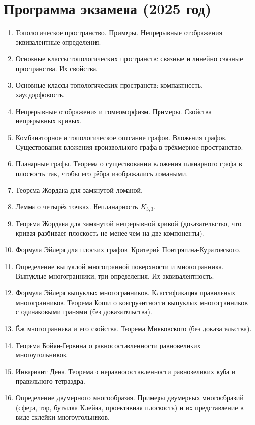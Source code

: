 \section{Программа экзамена (2025 год)}
\begin{enumerate}
    \item Топологическое пространство. Примеры. Непрерывные отображения: эквивалентные определения.
    \item Основные классы топологических пространств: связные и линейно связные пространства. Их свойства.
    \item Основные классы топологических пространств: компактность, хаусдорфовость.
    \item Непрерывные отображения и гомеоморфизм. Примеры. Свойства непрерывных кривых.
    \item Комбинаторное и топологическое описание графов. Вложения графов. Существования вложения произвольного графа в трёхмерное пространство.
    \item Планарные графы. Теорема о существовании вложения планарного графа в плоскость так, чтобы его рёбра изображались ломаными.
    \item Теорема Жордана для замкнутой ломаной.
    \item Лемма о четырёх точках. Непланарность $K_{3,3}$.
    \item Теорема Жордана для замкнутой непрерывной кривой (доказательство, что кривая разбивает плоскость не менее чем на две компоненты).
    \item Формула Эйлера для плоских графов. Критерий Понтрягина-Куратовского.
    \item Определение выпуклой многогранной поверхности и многогранника. Выпуклые многогранники, три определения. Их эквивалентность.
    \item Формула Эйлера выпуклых многогранников. Классификация правильных многогранников. Теорема Коши о конгруэнтности выпуклых многогранников с одинаковыми гранями (без доказательства).
    \item Ёж многогранника и его свойства. Теорема Минковского (без доказательства).
    \item Теорема Бойяи-Гервина о равносоставленности равновеликих многоугольников.
    \item Инвариант Дена. Теорема о неравносоставленности равновеликих куба и правильного тетраэдра.
    \item Определение двумерного многообразия. Примеры двумерных многообразий (сфера, тор, бутылка Клейна, проективная плоскость) и их представление в виде склейки многоугольников.

\end{enumerate}
